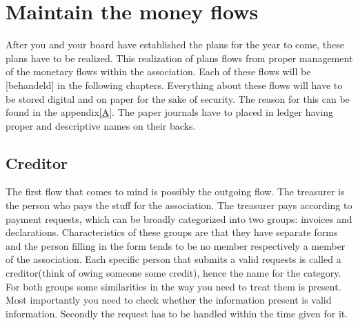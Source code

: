 \documentclass{report}
\begin{document}
\section{Maintain the money flows}
After you and your board have established the plans for the year to come, these plans have to be realized. This realization of plans flows from proper management of the monetary flows within the association. Each of these flows will be [behandeld] in the following chapters. Everything about these flows will have to be stored digital and on paper for the sake of security. The reason for this can be found in the appendix\ref{A}. The paper journals have to placed in ledger having proper and descriptive names on their backs.   

\subsection{Creditor}
The first flow that comes to mind is possibly the outgoing flow. The treasurer is the person who pays the stuff for the association. The treasurer pays according to payment requests, which can be broadly categorized into two groups: invoices and declarations. Characteristics of these groups are that they have separate forms and the person filling in the form tends to be no member respectively a member of the association. Each specific person that submits a valid requests is called a creditor(think of owing someone some credit), hence the name for the category. For both groups some similarities in the way you need to treat them is present. Most importantly you need to check whether the information present is valid information. Secondly the request has to be handled within the time given for it.          
\end{document}
